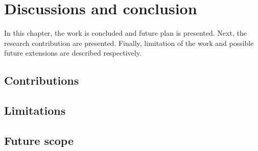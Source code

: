 \chapter{Discussions and conclusion}
In this chapter, the work is concluded and future plan is presented. Next, the research contribution
are presented. Finally, limitation of the work and possible future extensions are
described respectively.

\section{Contributions}
\section{Limitations}
\section{Future scope}